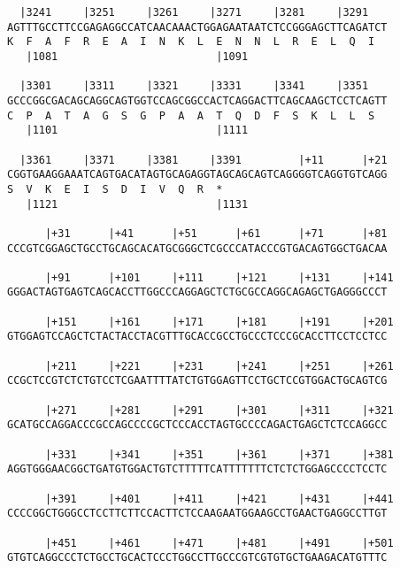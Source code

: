 \documentclass{article}
\begin{document}
\begin{Verbatim}
  |3241     |3251     |3261     |3271     |3281     |3291   
AGTTTGCCTTCCGAGAGGCCATCAACAAACTGGAGAATAATCTCCGGGAGCTTCAGATCT
K  F  A  F  R  E  A  I  N  K  L  E  N  N  L  R  E  L  Q  I  
   |1081                         |1091                      
  
  |3301     |3311     |3321     |3331     |3341     |3351   
GCCCGGCGACAGCAGGCAGTGGTCCAGCGGCCACTCAGGACTTCAGCAAGCTCCTCAGTT
C  P  A  T  A  G  S  G  P  A  A  T  Q  D  F  S  K  L  L  S  
   |1101                         |1111                      
  
  |3361     |3371     |3381     |3391         |+11      |+21
CGGTGAAGGAAATCAGTGACATAGTGCAGAGGTAGCAGCAGTCAGGGGTCAGGTGTCAGG
S  V  K  E  I  S  D  I  V  Q  R  *   
   |1121                         |1131                      
  
      |+31      |+41      |+51      |+61      |+71      |+81
CCCGTCGGAGCTGCCTGCAGCACATGCGGGCTCGCCCATACCCGTGACAGTGGCTGACAA
                                                            
      |+91      |+101     |+111     |+121     |+131     |+141
GGGACTAGTGAGTCAGCACCTTGGCCCAGGAGCTCTGCGCCAGGCAGAGCTGAGGGCCCT
                                                            
      |+151     |+161     |+171     |+181     |+191     |+201
GTGGAGTCCAGCTCTACTACCTACGTTTGCACCGCCTGCCCTCCCGCACCTTCCTCCTCC
                                                            
      |+211     |+221     |+231     |+241     |+251     |+261
CCGCTCCGTCTCTGTCCTCGAATTTTATCTGTGGAGTTCCTGCTCCGTGGACTGCAGTCG
                                                            
      |+271     |+281     |+291     |+301     |+311     |+321
GCATGCCAGGACCCGCCAGCCCCGCTCCCACCTAGTGCCCCAGACTGAGCTCTCCAGGCC
                                                            
      |+331     |+341     |+351     |+361     |+371     |+381
AGGTGGGAACGGCTGATGTGGACTGTCTTTTTCATTTTTTTCTCTCTGGAGCCCCTCCTC
                                                            
      |+391     |+401     |+411     |+421     |+431     |+441
CCCCGGCTGGGCCTCCTTCTTCCACTTCTCCAAGAATGGAAGCCTGAACTGAGGCCTTGT
                                                            
      |+451     |+461     |+471     |+481     |+491     |+501
GTGTCAGGCCCTCTGCCTGCACTCCCTGGCCTTGCCCGTCGTGTGCTGAAGACATGTTTC
                                                            

\end{Verbatim}
\end{document}
